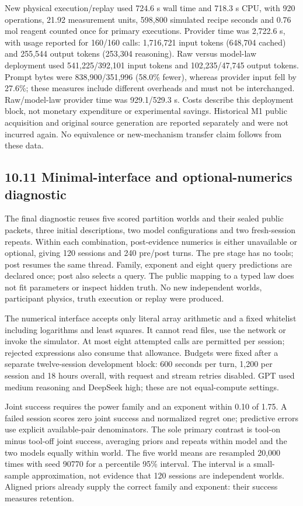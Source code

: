 \documentclass[10pt,twocolumn]{article}
\begin{document}
New physical execution/replay used 724.6 s wall time and 718.3 s CPU,
with 920 operations, 21.92 measurement units, 598,800 simulated recipe
seconds and 0.76 mol reagent counted once for primary executions.
Provider time was 2,722.6 s, with usage reported for 160/160 calls:
1,716,721 input tokens (648,704 cached) and 255,544 output tokens
(253,304 reasoning). Raw versus model-law deployment used
541,225/392,101 input tokens and 102,235/47,745 output tokens. Prompt
bytes were 838,900/351,996 (58.0\% fewer), whereas provider input fell
by 27.6\%; these measures include different overheads and must not be
interchanged. Raw/model-law provider time was 929.1/529.3 s. Costs
describe this deployment block, not monetary expenditure or experimental
savings. Historical M1 public acquisition and original source generation
are reported separately and were not incurred again. No equivalence or
new-mechanism transfer claim follows from these data.

\subsection{10.11 Minimal-interface and optional-numerics
diagnostic}\label{minimal-interface-and-optional-numerics-diagnostic}

The final diagnostic reuses five scored partition worlds and their
sealed public packets, three initial descriptions, two model
configurations and two fresh-session repeats. Within each combination,
post-evidence numerics is either unavailable or optional, giving 120
sessions and 240 pre/post turns. The pre stage has no tools; post
resumes the same thread. Family, exponent and eight query predictions
are declared once; post also selects a query. The public mapping to a
typed law does not fit parameters or inspect hidden truth. No new
independent worlds, participant physics, truth execution or replay were
produced.

The numerical interface accepts only literal array arithmetic and a
fixed whitelist including logarithms and least squares. It cannot read
files, use the network or invoke the simulator. At most eight attempted
calls are permitted per session; rejected expressions also consume that
allowance. Budgets were fixed after a separate twelve-session
development block: 600 seconds per turn, 1,200 per session and 18 hours
overall, with request and stream retries disabled. GPT used medium
reasoning and DeepSeek high; these are not equal-compute settings.

Joint success requires the power family and an exponent within 0.10 of
1.75. A failed session scores zero joint success and normalized regret
one; predictive errors use explicit available-pair denominators. The
sole primary contrast is tool-on minus tool-off joint success, averaging
priors and repeats within model and the two models equally within world.
The five world means are resampled 20,000 times with seed 90770 for a
percentile 95\% interval. The interval is a small-sample approximation,
not evidence that 120 sessions are independent worlds. Aligned priors
already supply the correct family and exponent: their success measures
retention.
\end{document}
